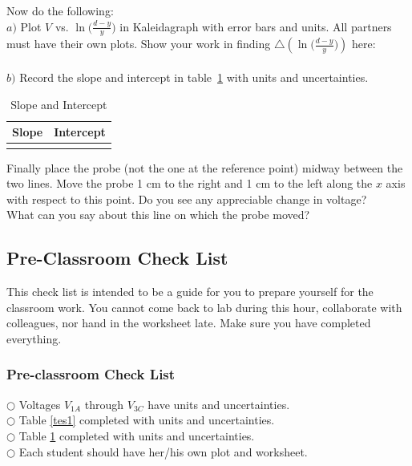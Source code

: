 {{{\noindent Now do the following:\\
$a)$ Plot $V$ vs. $\ln\big({\frac{d-y}{y}}\big)$ in Kaleidagraph
with error bars and units.  All partners must have their own
plots. Show your
work in finding $\bigtriangleup\left(\ln{\big(\frac{d-y}{y}\big)}\right)$ here:\\
\vspace{8cm}\\
\noindent$b)$ Record the slope and intercept in table~\ref{tes2}
with units and uncertainties.\\
\begin{table}
\hspace{2cm}\begin{tabular}{|c|c|}\hline
\hspace{1cm} Slope \hspace{1cm} & \hspace{1cm} Intercept \hspace{1cm} \\
\hline
\hspace{4cm} & \hspace{4cm}\\
\hline
\end{tabular}
\caption{Slope and Intercept} \label{tes2}
\end{table}

 \noindent Finally place the probe (not the one at
the reference point) midway between the two lines.  Move the probe
1 cm to the right and 1 cm to the left along the $x$ axis with
respect to this point. Do you see any appreciable change in voltage? \\
What can you say about this line on which the probe moved?
\vspace{2cm}

\subsection{Pre-Classroom Check List}
\noindent This check list is intended to be a guide for you to
prepare yourself for the classroom work.  You cannot come back
to lab during this hour, collaborate with colleagues, nor hand in
the worksheet late.  Make sure you have completed everything.
\subsubsection{Pre-classroom Check List}
$\bigcirc$ \hspace{1cm} Voltages $V_{1A}$ through $V_{3C}$ have
units and uncertainties.\\
$\bigcirc$ \hspace{1cm} Table \ref{tes1} completed with units and
uncertainties.\\
$\bigcirc$ \hspace{1cm} Table \ref{tes2} completed with units and
uncertainties.\\
$\bigcirc$ \hspace{1cm} Each student should have her/his own plot
and worksheet.

}}}
